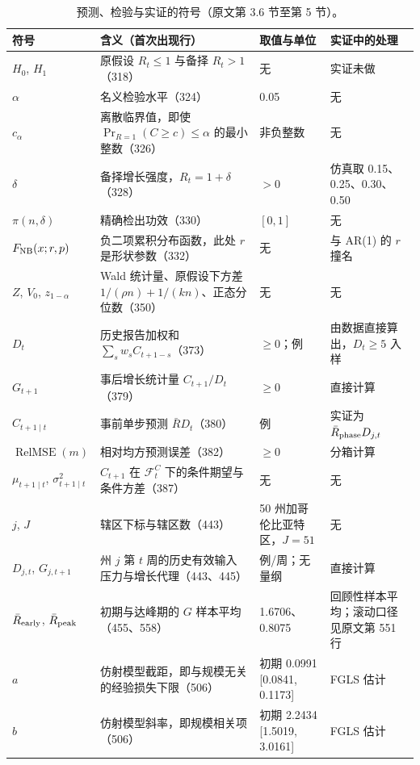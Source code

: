 \begin{table}[!tbp]
\centering
\footnotesize
\caption{预测、检验与实证的符号（原文第 3.6 节至第 5 节）。}
\label{tab:sym-emp}
\begin{tabular}{L{1.9cm}L{5.8cm}L{2.8cm}L{4.4cm}}
\toprule
符号 & 含义（首次出现行） & 取值与单位 & 实证中的处理 \\
\midrule
$H_0$, $H_1$ & 原假设 $R_t\le1$ 与备择 $R_t>1$（318） & 无 & 实证未做 \\
$\alpha$ & 名义检验水平（324） & 0.05 & 无 \\
$c_\alpha$ & 离散临界值，即使 $\Pr_{R=1}(C\ge c)\le\alpha$ 的最小整数（326） & 非负整数 & 无 \\
$\delta$ & 备择增长强度，$R_t=1+\delta$（328） & $>0$ & 仿真取 0.15、0.25、0.30、0.50 \\
$\pi(n,\delta)$ & 精确检出功效（330） & $[0,1]$ & 无 \\
$F_{\rm NB}(x;r,p)$ & 负二项累积分布函数，此处 $r$ 是形状参数（332） & 无 & 与 AR(1) 的 $r$ 撞名 \\
$Z$, $V_0$, $z_{1-\alpha}$ & Wald 统计量、原假设下方差 $1/(\rho n)+1/(kn)$、正态分位数（350） & 无 & 无 \\
$D_t$ & 历史报告加权和 $\sum_sw_sC_{t+1-s}$（373） & $\ge0$；例 & 由数据直接算出，$D_t\ge5$ 入样 \\
$G_{t+1}$ & 事后增长统计量 $C_{t+1}/D_t$（379） & $\ge0$ & 直接计算 \\
$\widehat C_{t+1\mid t}$ & 事前单步预测 $\bar RD_t$（380） & 例 & 实证为 $\bar R_{\rm phase}D_{j,t}$ \\
$\operatorname{RelMSE}(m)$ & 相对均方预测误差（382） & $\ge0$ & 分箱计算 \\
$\mu_{t+1\mid t}$, $\sigma^2_{t+1\mid t}$ & $C_{t+1}$ 在 $\mathcal F_t^C$ 下的条件期望与条件方差（387） & 无 & 无 \\
$j$, $J$ & 辖区下标与辖区数（443） & 50 州加哥伦比亚特区，$J=51$ & 无 \\
$D_{j,t}$, $G_{j,t+1}$ & 州 $j$ 第 $t$ 周的历史有效输入压力与增长代理（443、445） & 例/周；无量纲 & 直接计算 \\
$\bar R_{\rm early}$, $\bar R_{\rm peak}$ & 初期与达峰期的 $G$ 样本平均（455、558） & 1.6706、0.8075 & 回顾性样本平均；滚动口径见原文第 551 行 \\
$a$ & 仿射模型截距，即与规模无关的经验损失下限（506） & 初期 0.0991 [0.0841, 0.1173] & FGLS 估计 \\
$b$ & 仿射模型斜率，即规模相关项（506） & 初期 2.2434 [1.5019, 3.0161] & FGLS 估计 \\

\end{tabular}
\end{table}
